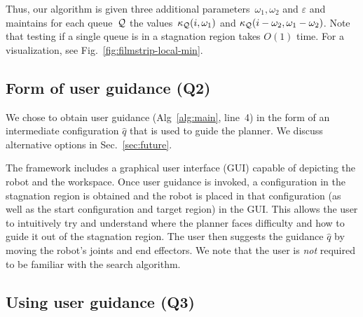 \documentclass[conference]{IEEEtran}
\begin{document}

Thus, our algorithm is given three additional parameters~$\omega_1, \omega_2$ and $\varepsilon$ 
and maintains  for each queue~$\mathcal{Q}$ the values~$\kappa_{\mathcal{Q}}(i, \omega_1)$ and $\kappa_{\mathcal{Q}}(i - \omega_2, \omega_1 - \omega_2)$.
Note that testing if a single queue is in a stagnation region takes $O(1)$ time.
For a visualization, see Fig.~\ref{fig:filmstrip-local-min}.

\subsection{Form of user guidance (Q2)}
\label{sec:q2}
We chose to obtain user guidance 
(Alg~\ref{alg:main}, line~4)
in the form of an intermediate configuration $\hat{q}$ that is used to guide the planner. We discuss alternative options in Sec.~\ref{sec:future}.

The framework includes a graphical user interface (GUI)
 capable of  depicting the robot and the workspace.
Once user guidance is invoked, 
a configuration in the stagnation region is obtained and the robot is placed in that configuration (as well as the start configuration and target region) in the GUI.
This allows the user to intuitively try and understand where the planner faces difficulty and how to guide it out of the stagnation region.
The user then suggests the guidance $\hat{q}$ by moving the robot's joints and end effectors.
We note that the user is \emph{not} required to be familiar with the search algorithm.

\subsection{Using user guidance (Q3)}
\label{sec:q3}
\end{document}
